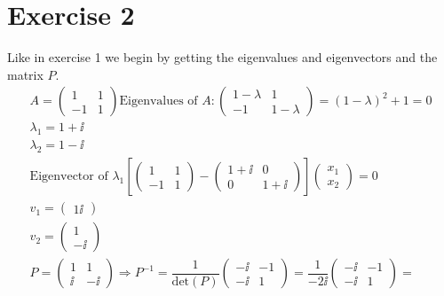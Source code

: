 \section{Exercise 2}
Like in exercise 1 we begin by getting the eigenvalues and eigenvectors and the matrix $P$.
\begin{gather*}
A =\left( \begin{array}{cc}
1 & 1 \\ -1 & 1
\end{array} \right)
\text{Eigenvalues of } A:
\left( \begin{array}{cc}
1 - \lambda & 1 \\ 
-1 & 1 -\lambda 
\end{array} \right)
=
(1-\lambda)^2 + 1 = 0\\
\lambda _1 = 1 +\ii \\
\lambda _2 = 1 -\ii \\
\text{Eigenvector of }\lambda _1
\left[
\left( \begin{array}{cc}
1 & 1 \\
-1 & 1
\end{array} \right) 
-
\left( \begin{array}{cc}
1+\ii & 0\\
0 & 1+\ii
\end{array} \right)
\right]
\left( \begin{array}{c}
x_1 \\ x_2
\end{array} \right)
= 0 \\
v_1 =
\left( \begin{array}{c}
1 \ii
\end{array} \right)
\\
v_2 =
\left( \begin{array}{c}
1 \\ -\ii
\end{array} \right)
\\
P =
\left( \begin{array}{cc}
1 & 1\\
\ii & -\ii
\end{array} \right) 
\Rightarrow P^{-1} = \dfrac{1}{\text{det}(P)}
\left( \begin{array}{cc}
-\ii & -1 \\
-\ii & 1
\end{array} \right) =  \dfrac{1}{-2 \ii}
\left( \begin{array}{cc}
-\ii & -1 \\
-\ii & 1
\end{array} \right) = 

\end{gather*}
